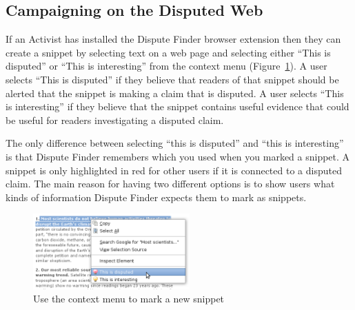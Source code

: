 \documentclass{www2010-submission}
\newcommand{\todo}[1]{}
\begin{document}
\todo{Talk about searches}
\todo{Cite work on collaborative filtering}
\todo{Mention the sidebar?}


\subsection{Campaigning on the Disputed Web}

If an Activist has installed the Dispute Finder browser extension then they can create a snippet by selecting text on a web page and selecting either ``This is disputed'' or ``This is interesting'' from the context menu (Figure~\ref{createprocess}). A user selects ``This is disputed'' if they believe that readers of that snippet should be alerted that the snippet is making a claim that is disputed. A user selects ``This is interesting'' if they believe that the snippet contains useful evidence that could be useful for readers investigating a disputed claim. 

The only difference between selecting ``this is disputed'' and ``this is interesting'' is that Dispute Finder remembers which you used when you marked a snippet. A snippet is only highlighted in red for other users if it is connected to a disputed claim. The main reason for having two different options is to show users what kinds of information Dispute Finder expects them to mark as snippets.
\todo{Say something smart about the difference}

\begin{figure}[tb]
	\begin{center}
	\includegraphics[width=6cm]{../screenshots/v2_snipmark.png}
	\caption{Use the context menu to mark a new snippet}
	\label{createprocess}
	\end{center}
\end{figure}
\end{document}
